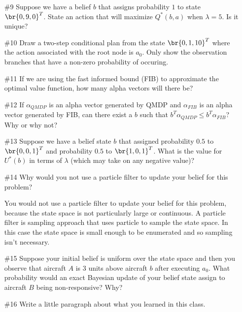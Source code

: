 \documentclass[12pt, oneside]{article}
\begin{document}
\begin{enumerate}
  \item[\#9]
    Suppose we have a belief $b$ that assigns probability $1$ to state $\br{0, 9, 0}^T$.
    State an action that will maximize $Q^*(b, a)$ when $\lambda = 5$.
    Is it unique?

  \item[\#10]
    Draw a two-step conditional plan from the state $\br{0, 1, 10}^T$ where the
    action associated with the root node is $a_0$.
    Only show the observation branches that have a non-zero probability of
    occuring.

  \item[\#11]
    If we are using the fast informed bound (FIB) to approximate the optimal
    value function, how many alpha vectors will there be?

  \item[\#12]
    If $\alpha_{QMDP}$ is an alpha vector generated by QMDP and $\alpha_{FIB}$
    is an alpha vector generated by FIB, can there exist a $b$ such that
    $b^T \alpha_{QMDP} \le b^T \alpha_{FIB}$?
    Why or why not?

  \item[\#13]
    Suppose we have a belief state $b$ that assigned probability $0.5$ to
    $\br{0, 0, 1}^T$ and probability $0.5$ to $\br{1, 0, 1}^T$.
    What is the value for $U^*(b)$ in terms of $\lambda$ (which may take on any
    negative value)?

  \item[\#14] %
    Why would you not use a particle filter to update your belief for this
    problem?

    You would not use a particle filter to update your belief for this problem,
    because the state space is not particularly large or continuous.
    A particle filter is sampling approach that uses particle to sample the
    state space.
    In this case the state space is small enough to be enumerated and so
    sampling isn't necessary.

  \item[\#15]
    Suppose your initial belief is uniform over the state space and then you
    observe that aircraft $A$ is $3$ units above aircraft $b$ after executing
    $a_0$.
    What probability would an exact Bayesian update of your belief state assign to
    aircraft $B$ being non-responsive?
    Why?

  \item[\#16]
    Write a little paragraph about what you learned in this class.
\end{enumerate}
\end{document}
